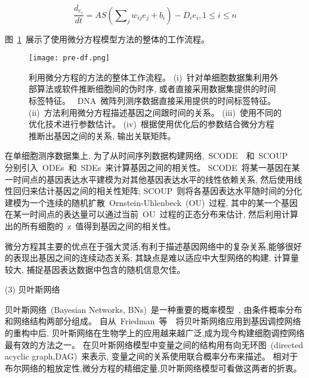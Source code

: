 \begin{equation}
\frac{{d_{e_i } }}{{dt}} = AS(\sum\nolimits_j {w_{ij} e_j } + b_i) - D_i e_i ,1 \le i \le n
\end{equation}

图~\ref{fig:pre-df}~展示了使用微分方程模型方法的整体的工作流程。
\begin{figure}[!htbp]
    \centering
    \texttt{[image: pre-df.png]}
    \caption{
        利用微分方程的方法的整体工作流程。
        (i)~针对单细胞数据集利用外部算法或软件推断细胞间的伪时序, 或者直接采用数据集提供的时间标签特征。
        ~DNA~微阵列测序数据直接采用提供的时间标签特征。
        (ii)~方法利用微分方程描述基因之间跟时间的关系。
        (iii)~使用不同的优化技术进行参数估计。
        (iv)~根据使用优化后的参数结合微分方程推断出基因之间的关系, 输出关联矩阵。
    }
    \label{fig:pre-df}
\end{figure}

在单细胞测序数据集上, 
为了从时间序列数据构建网络,~SCODE~\cite{matsumoto2017scode}~和~SCOUP~\cite{matsumoto2016scoup}~
分别引入~ODEs~和~SDEs~来计算基因之间的相关性。
SCODE~将某一基因在某一时间点的基因表达水平建模为对其他基因表达水平的线性依赖关系,
然后使用线性回归来估计基因之间的相关性矩阵;
SCOUP~则将各基因表达水平随时间的分化建模为一个连续的随机扩散~Ornstein-Uhlenbeck~(OU)~过程,
其中的某一个基因在某一时间点的表达量可以通过当前~OU~过程的正态分布来估计,
然后利用计算出的所有细胞的~z~值得到基因之间的相关性。

微分方程其主要的优点在于强大灵活,有利于描述基因网络中的复杂关系,能够很好的表现出基因之间的连续动态关系;
其缺点是难以适应中大型网络的构建, 计算量较大, 捕捉基因表达数据中包含的随机信息欠佳。

(3) 贝叶斯网络

贝叶斯网络~(Bayesian Networks, BNs)~是一种重要的概率模型~\cite{kim2003inferring,zou2004new,chen2006effective,needham2007primer,lo2015high},
由条件概率分布和网络结构两部分组成。
自从~Friedman~等~\cite{friedman2000using}~将贝叶斯网络应用到基因调控网络的重构中后,
贝叶斯网络在生物学上的应用越来越广泛,成为现今构建细胞调控网络最有效的方法之一。
在贝叶斯网络模型中变量之间的结构用有向无环图~(directed acyclic graph,DAG)~来表示,
变量之间的关系使用联合概率分布来描述。
相对于布尔网络的粗放定性,微分方程的精细定量,贝叶斯网络模型可看做这两者的折衷。


